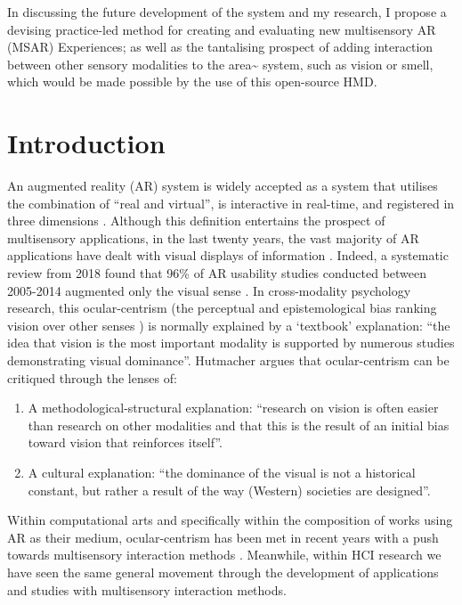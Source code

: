 In discussing the future development of the system and my research, I propose a devising practice-led method for creating and evaluating new multisensory AR (MSAR) Experiences; as well as the tantalising prospect of adding interaction between other sensory modalities to the area\textasciitilde{} system, such as vision or smell, which would be made possible by the use of this open-source HMD.

\section{Introduction}                          \label{sec: area-intro}
An augmented reality (AR) system is widely accepted as a system that utilises the combination of “real and virtual”, is interactive in real-time, and registered in three dimensions \citep{azuma1997}. Although this definition entertains the prospect of multisensory applications, in the last twenty years, the vast majority of AR applications have dealt with visual displays of information \citep{billinghurst2015, schraffenberger2016}. Indeed, a systematic review from 2018 found that 96\% of AR usability studies conducted between 2005-2014 augmented only the visual sense \citep{dey2018}. In cross-modality psychology research, this ocular-centrism (the perceptual and epistemological bias ranking vision over other senses \citep{oxfordreference2020}) is normally explained by a ‘textbook’ explanation: “the idea that vision is the most important modality is supported by numerous studies demonstrating visual dominance”. Hutmacher \citeyearpar{hutmacher2019} argues that ocular-centrism can be critiqued through the lenses of:
\begin{enumerate}
    \item A methodological-structural explanation: “research on vision is often easier than research on other modalities and that this is the result of an initial bias toward vision that reinforces itself”.
    \item A cultural explanation: “the dominance of the visual is not a historical constant, but rather a result of the way (Western) societies are designed”.
\end{enumerate}
Within computational arts and specifically within the composition of works using AR as their medium, ocular-centrism has been met in recent years with a push towards multisensory interaction methods \citep{billinghurst2015, schraffenberger2016,papagiannis2014,kiefer2018}. Meanwhile, within HCI research we have seen the same general movement through the development of applications and studies with multisensory interaction methods.

